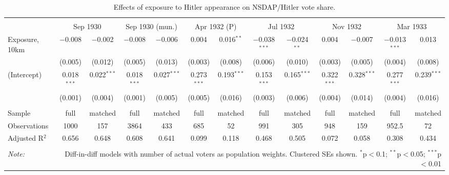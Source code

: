 
\begin{table}[!htbp] \centering 
  \caption{Effects of exposure to Hitler appearance on NSDAP/Hitler vote share.\vspace{-.25cm}} 
  \label{tab:nsdap-voteshare-dd} 
\scriptsize 
\begin{tabular}{@{\extracolsep{5pt}}lcccccccccccc} 
\\[-1.8ex]\hline 
\hline \\[-1.8ex] 
 & \multicolumn{2}{c}{Sep 1930} & \multicolumn{2}{c}{Sep 1930 (mun.)} & \multicolumn{2}{c}{Apr 1932 (P)} & \multicolumn{2}{c}{Jul 1932} & \multicolumn{2}{c}{Nov 1932} & \multicolumn{2}{c}{Mar 1933} \\ 
 \cmidrule(r){2-3}\cmidrule(r){4-5}\cmidrule(r){6-7}\cmidrule(r){8-9}\cmidrule(r){10-11}\cmidrule(r){12-13}Exposure, 10km & $-$0.008 & $-$0.002 & $-$0.008 & $-$0.006 & 0.004 & 0.016$^{**}$ & $-$0.038$^{***}$ & $-$0.024$^{**}$ & 0.004 & $-$0.007 & $-$0.013$^{***}$ & 0.013 \\ 
  & (0.005) & (0.012) & (0.005) & (0.013) & (0.003) & (0.008) & (0.006) & (0.010) & (0.003) & (0.005) & (0.004) & (0.008) \\ 
  (Intercept) & 0.018$^{***}$ & 0.022$^{***}$ & 0.018$^{***}$ & 0.027$^{***}$ & 0.273$^{***}$ & 0.193$^{***}$ & 0.153$^{***}$ & 0.165$^{***}$ & 0.322$^{***}$ & 0.328$^{***}$ & 0.277$^{***}$ & 0.239$^{***}$ \\ 
  & (0.001) & (0.004) & (0.001) & (0.005) & (0.005) & (0.016) & (0.003) & (0.006) & (0.004) & (0.014) & (0.004) & (0.016) \\ 
 \hline \\[-1.8ex] 
Sample & full & matched & full & matched & full & matched & full & matched & full & matched & full & matched \\ 
Observations & 1000 & 157 & 3864 & 433 & 685 & 52 & 991 & 305 & 948 & 159 & 952.5 & 72 \\ 
Adjusted R$^{2}$ & 0.656 & 0.648 & 0.608 & 0.641 & 0.099 & 0.118 & 0.468 & 0.505 & 0.072 & 0.058 & 0.308 & 0.434 \\ 
\hline 
\hline \\[-1.8ex] 
\textit{Note:}  & \multicolumn{12}{r}{Diff-in-diff models with number of actual voters as population weights. Clustered SEs shown. $^{*}$p$<$0.1; $^{**}$p$<$0.05; $^{***}$p$<$0.01} \\ 
\end{tabular} 
\end{table} 
